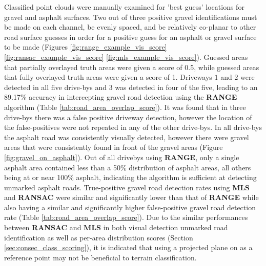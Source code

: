 \documentclass[numbered,pdftex]{ohio-etd}
\begin{document}
{{{		{Classified point clouds were manually examined for 'best guess' locations for gravel and asphalt surfaces. Two out of three positive gravel identifications must be made on each channel, be evenly spaced, and be relatively co-planar to other road surface guesses in order for a positive guess for an asphalt or gravel surface to be made (Figures \ref{fig:range_example_vis_score} \ref{fig:ransac_example_vis_score} \ref{fig:mls_example_vis_score}). Guessed areas that partially overlayed truth areas were given a score of 0.5, while guessed areas that fully overlayed truth areas were given a score of 1. Driveways $1$ and $2$ were detected in all five drive-bys and $3$ was detected in four of the five, leading to an 89.17\% accuracy in intercepting gravel road detection using the \textbf{RANGE} algorithm (Table \ref{tab:road_area_overlap_score}). It was found that in three drive-bys there was a false positive driveway detection, however the location of the false-positives were not repeated in any of the other drive-bys. In all drive-bys the asphalt road was consistently visually detected, however there were gravel areas that were consistently found in front of the gravel areas (Figure \ref{fig:gravel_on_asphalt}). Out of all drivebys using \textbf{RANGE}, only a single asphalt area contained less than a 50\% distribution of asphalt areas, all others being at or near 100\% asphalt, indicating the algorithm is sufficient at detecting unmarked asphalt roads. True-positive gravel road detection rates using \textbf{MLS} and \textbf{RANSAC} were similar and significantly lower than that of \textbf{RANGE} while also having a similar and significantly higher false-positive gravel road detection rate (Table \ref{tab:road_area_overlap_score}). Due to the similar performances between \textbf{RANSAC} and \textbf{MLS} in both visual detection unmarked road identification as well as per-area distribution scores (Section \ref{sec:consec_class_scoring}), it is indicated that using a projected plane on as a reference point may not be beneficial to terrain classification.}
		
}}}
\end{document}
